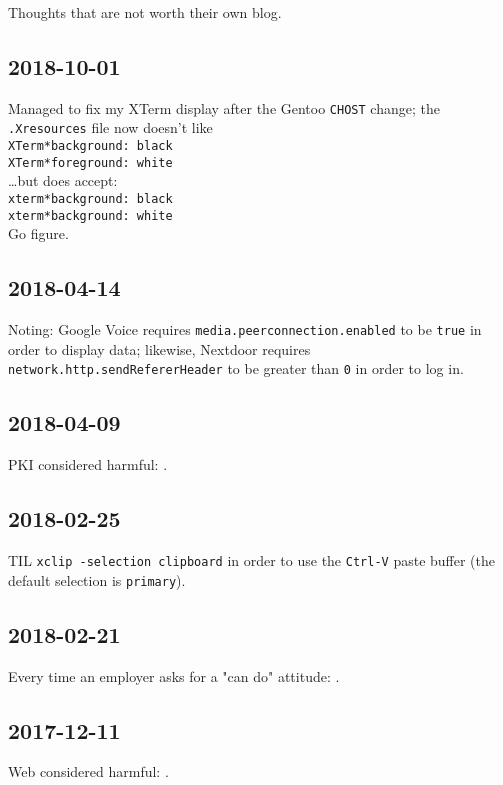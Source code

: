 \documentclass{article}
\begin{document}
Thoughts that are not worth their own blog.

\subsection{2018-10-01}
Managed to fix my XTerm display after the Gentoo \texttt{CHOST} change; the \texttt{.Xresources} file now doesn't like \\
    \texttt{XTerm*background: black} \\
    \texttt{XTerm*foreground: white} \\
\ldots but does accept: \\
    \texttt{xterm*background: black} \\
    \texttt{xterm*background: white} \\
Go figure.

\subsection{2018-04-14}
Noting: Google Voice requires \texttt{media.peerconnection.enabled} to be \texttt{true} in order to display data; likewise, Nextdoor requires \texttt{network.http.sendRefererHeader} to be greater than \texttt{0} in order to log in.

\subsection{2018-04-09}
PKI considered harmful: .

\subsection{2018-02-25}
TIL \texttt{xclip -selection clipboard} in order to use the \texttt{Ctrl-V} paste buffer (the default selection is \texttt{primary}).

\subsection{2018-02-21}
Every time an employer asks for a "can do" attitude: .

\subsection{2017-12-11}
Web considered harmful: .
\end{document}
